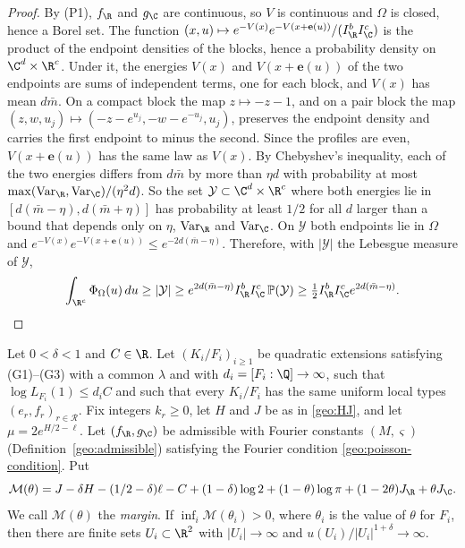 \begin{proof}
By (P1), $f_\R$ and $g_\C$ are continuous, so $V$ is continuous and
$\Omega$ is closed, hence a Borel set. The function
$(x,u)\mapsto e^{-V(x)}e^{-V(x+\mathbf e(u))}/(I_\R^bI_\C^c)$ is the
product of the endpoint densities of the blocks, hence a probability
density on $\C^d\times\R^c$. Under it, the energies $V(x)$ and
$V(x+\mathbf e(u))$ of the two endpoints are sums of independent terms, one for
each block, and $V(x)$ has mean $d\bar m$. On a compact block the map
$z\mapsto-z-1$, and on a pair block the map
$(z,w,u_j)\mapsto(-z-e^{u_j},-w-e^{-u_j},u_j)$, preserves the endpoint
density and carries the first endpoint to minus the second. Since the
profiles are even, $V(x+\mathbf e(u))$ has the same law as $V(x)$. By
Chebyshev's inequality, each of the two energies differs from $d\bar m$
by more than $\eta d$ with probability at most
$\max(\mathrm{Var}_\R,\mathrm{Var}_\C)/(\eta^2d)$. So the set
$\mathcal Y\subset\C^d\times\R^c$ where both energies lie in
$[d(\bar m-\eta),d(\bar m+\eta)]$ has probability at least $1/2$ for all
$d$ larger than a bound that depends only on $\eta$, $\mathrm{Var}_\R$ and
$\mathrm{Var}_\C$. On $\mathcal Y$ both endpoints lie in $\Omega$ and
$e^{-V(x)}e^{-V(x+\mathbf e(u))}\le e^{-2d(\bar m-\eta)}$. Therefore, with
$|\mathcal Y|$ the Lebesgue measure of $\mathcal Y$,
\[
 \int_{\R^c}\Phi_\Omega(u)\,du\ge|\mathcal Y|
 \ge e^{2d(\bar m-\eta)}I_\R^bI_\C^c\,\mathbb P(\mathcal Y)
 \ge\tfrac12I_\R^bI_\C^ce^{2d(\bar m-\eta)}.
\]
\end{proof}

\begin{proposition}\label{geo:transfer}
Let $0<\delta<1$ and $C\in\R$. Let $(K_i/F_i)_{i\ge1}$ be quadratic
extensions satisfying (G1)--(G3) with a common $\lambda$ and with
$d_i=[F_i:\Q]\to\infty$, such that $\log L_{F_i}(1)\le d_iC$ and such
that every $K_i/F_i$ has the same uniform local types
$(e_r,f_r)_{r\in\mathcal R}$. Fix integers $k_r\ge0$, let $H$ and $J$ be
as in \eqref{geo:HJ}, and let $\mu=2e^{H/2-\ell}$. Let $(f_\R,g_\C)$ be
admissible with Fourier constants $(M,\varsigma)$ (Definition~\ref{geo:admissible})
satisfying the Fourier
condition \eqref{geo:poisson-condition}. Put
\begin{equation}\label{geo:general-margin}
 \mathcal M(\theta)=J-\delta H-(1/2-\delta)\ell-C
 +(1-\delta)\log2+(1-\theta)\log\pi
 +(1-2\theta)J_\R+\theta J_\C.
\end{equation}
We call $\mathcal M(\theta)$ the \emph{margin}. If
$\inf_i\mathcal M(\theta_i)>0$, where $\theta_i$ is the value of
$\theta$ for $F_i$, then there are finite sets $U_i\subset\R^2$ with
$|U_i|\to\infty$ and $u(U_i)/|U_i|^{1+\delta}\to\infty$.
\end{proposition}

